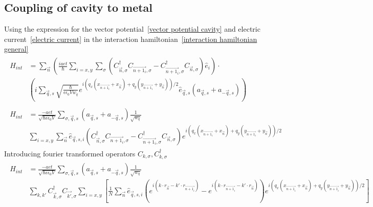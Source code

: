 \documentclass{article}
\begin{document}
\subsection{Coupling of cavity to metal}
Using the expression for the vector potential~\ref{vector potential cavity} and electric current~\ref{electric current} in the interaction hamiltonian~\ref{interaction hamiltonian general}
\begin{align*}
    \begin{split}
    H_{int} &= \sum_{\vec{n}} \left(\frac{iaet}{\hbar} \sum_{i=x,y}\sum_{\sigma} (C_{\vec{n},\sigma}^{\dagger} C_{\vec{n + 1_i},\sigma} - C_{\vec{n + 1_i},\sigma}^{\dagger} C_{\vec{n},\sigma})\hat{e}_i\right) \cdot \\     
            &\left(i \sum_{\vec{q},s} \sqrt{\frac{\hbar}{\epsilon \epsilon_0 V w_q}} e^{i\left(q_x \left(x_{\vec{n + 1_i}} + x_{\vec{n}} \right) + q_y \left(y_{\vec{n + 1_i}} + y_{\vec{n}} \right)\right)/2} \hat{e}_{\vec{q},s}\left(a_{\vec{q},s} + a_{-\vec{q}, s}\right)\right)
    \end{split}\\
    \begin{split}
    H_{int} &= \frac{-aet}{\sqrt{\hbar \epsilon \epsilon_0 V} } \sum_{\sigma,\vec{q},s} \left(a_{\vec{q},s} + a_{-\vec{q}, s}\right) \frac{1}{\sqrt{w_q}} \\ 
            &  \sum_{i=x,y} \sum_{\vec{n}} \hat{e}_{\vec{q},s,i} (C_{\vec{n},\sigma}^{\dagger} C_{\vec{n + 1_i},\sigma} - C_{\vec{n + 1_i},\sigma}^{\dagger} C_{\vec{n},\sigma}) e^{i\left(q_x \left(x_{\vec{n + 1_i}} + x_{\vec{n}} \right) + q_y \left(y_{\vec{n + 1_i}} + y_{\vec{n}} \right)\right)/2}
    \end{split}
     \label{interaction hamiltonian step 1}\textbf{}
\end{align*}
Introducing fourier transformed operators $C_{k,\sigma} , C_{k,\sigma}^{\dagger}$
\begin{align*}
    \begin{split}
    H_{int} &= \frac{-aet}{\sqrt{\hbar \epsilon \epsilon_0 V} } \sum_{\sigma,\vec{q},s} \left(a_{\vec{q},s} + a_{-\vec{q}, s}\right) \frac{1}{\sqrt{w_q}} \\ 
            & \sum_{k,k'}   C_{\vec{k},\sigma}^{\dagger} C_{\vec{k'},\sigma} \sum_{i=x,y} \left[\frac{1}{N}\sum_{\vec{n}} \hat{e}_{\vec{q},s,i} ( e^{i\left(k \cdot r_{\vec{n}} - k' \cdot r_{\vec{n+1_i}} \right)} - e^{i\left(k \cdot r_{\vec{n+1_i}} - k' \cdot r_{\vec{n}} \right)}) e^{i\left(q_x \left(x_{\vec{n + 1_i}} + x_{\vec{n}} \right) + q_y \left(y_{\vec{n + 1_i}} + y_{\vec{n}} \right)\right)/2}\right]
    \end{split}
    \label{interaction hamiltonian step 2}
\end{align*}
\end{document}
